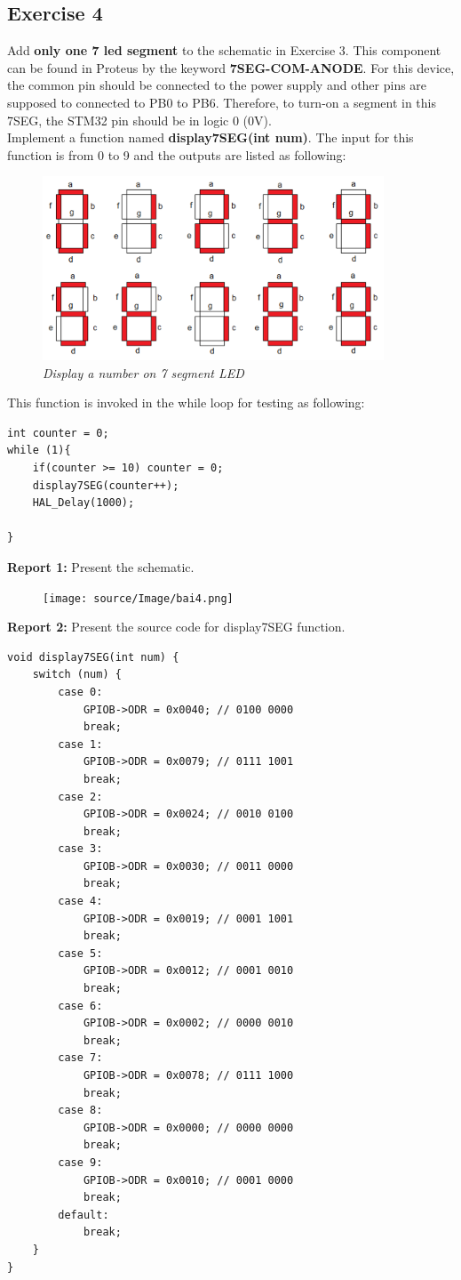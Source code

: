\subsection{Exercise 4}
Add \textbf{only one 7 led segment} to the schematic in Exercise 3. This component can be found in Proteus by the keyword \textbf{7SEG-COM-ANODE}. For this device, the common pin should be connected to the power supply and other pins are supposed to connected to PB0 to PB6. Therefore, to turn-on a segment in this 7SEG, the STM32 pin should be in logic 0 (0V).\\

Implement a function named \textbf{display7SEG(int num)}. The input for this function is from 0 to 9 and the outputs are listed as following:

\begin{figure}[!htp]
    \centering
    \includegraphics[width=4in]{source/picture/bai_1/pic3.PNG}
    \caption{\textit{Display a number on  7 segment LED}}
    \label{bai1_pic3}
\end{figure}

\newpage
This function is invoked in the while loop for testing as following:
\begin{lstlisting}[caption=An example for your source code]
int counter = 0;
while (1){
    if(counter >= 10) counter = 0;    
    display7SEG(counter++);
    HAL_Delay(1000);

}
\end{lstlisting}

\textbf{Report 1: } Present the schematic.\\

\begin{figure}[!htp]
    \centering
    \texttt{[image: source/Image/bai4.png]}
\end{figure}

\textbf{Report 2: } Present the source code for display7SEG function.
\begin{lstlisting}
void display7SEG(int num) {
	switch (num) {
		case 0:
			GPIOB->ODR = 0x0040; // 0100 0000
			break;
		case 1:
			GPIOB->ODR = 0x0079; // 0111 1001
			break;
		case 2:
			GPIOB->ODR = 0x0024; // 0010 0100
			break;
		case 3:
			GPIOB->ODR = 0x0030; // 0011 0000
			break;
		case 4:
			GPIOB->ODR = 0x0019; // 0001 1001
			break;
		case 5:
			GPIOB->ODR = 0x0012; // 0001 0010
			break;
		case 6:
			GPIOB->ODR = 0x0002; // 0000 0010
			break;
		case 7:
			GPIOB->ODR = 0x0078; // 0111 1000
			break;
		case 8:
			GPIOB->ODR = 0x0000; // 0000 0000
			break;
		case 9:
			GPIOB->ODR = 0x0010; // 0001 0000
			break;
		default:
			break;
	}
}
\end{lstlisting}

